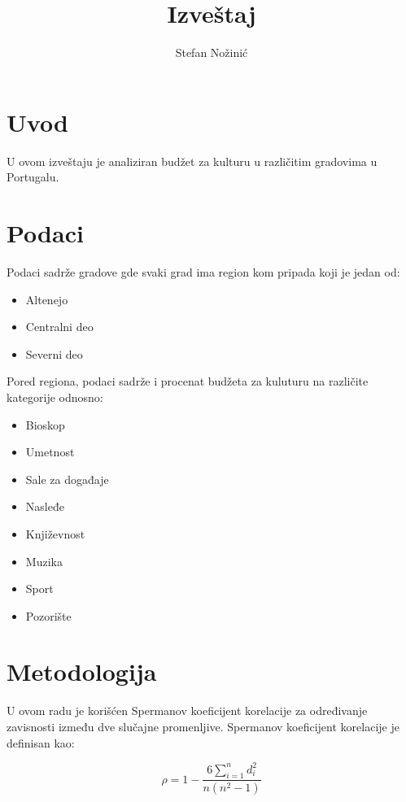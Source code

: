 \documentclass{article}
\begin{document}
\title{Izveštaj}
\author{Stefan Nožinić}
\maketitle
\section{Uvod}

U ovom izveštaju je analiziran budžet za kulturu u različitim gradovima u Portugalu. 

\section{Podaci}

Podaci sadrže gradove gde svaki grad ima region kom pripada koji je jedan od:

\begin{itemize}
    \item Altenejo
    \item Centralni deo 
    \item Severni deo 
\end{itemize}

Pored regiona, podaci sadrže i procenat budžeta za kuluturu na različite kategorije odnosno:

\begin{itemize}
    \item Bioskop
    \item Umetnost
    \item Sale za događaje
    \item Nasleđe
    \item Književnost
    \item Muzika
    \item Sport
    \item Pozorište
\end{itemize}

\section{Metodologija}

U ovom radu je korišćen Spermanov koeficijent korelacije za određivanje zavisnosti između dve slučajne promenljive. Spermanov koeficijent korelacije je definisan kao:

\begin{equation}
\rho = 1 - \frac{6\sum_{i=1}^{n}d_{i}^{2}}{n(n^{2}-1)}
\end{equation}
\end{document}
